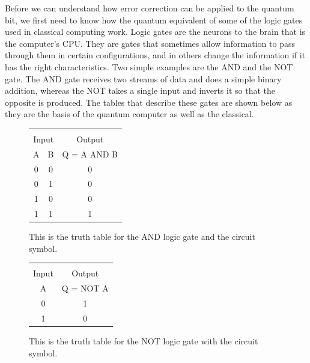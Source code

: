 Before we can understand how error correction can be applied to the quantum bit, we first need to know how the quantum equivalent of some of the logic gates used in classical computing work. Logic gates are the neurons to the brain that is the computer's CPU. They are gates that sometimes allow information to pass through them in certain configurations, and in others change the information if it has the right characteristics. Two simple examples are the AND and the NOT gate. The AND gate receives two streams of data and does a simple binary addition, whereas the NOT takes a single input and inverts it so that the opposite is produced. The tables that describe these gates are shown below as they are the basis of the quantum computer as well as the classical. 
\begin{figure}[ht]
	\centering
	\begin{minipage}[c]{0.45\linewidth}
		\centering
	 	
	 	\begin{tabular}{c|c|c}
			\multicolumn{3}{c}{}\\
			\multicolumn{2}{c|}{Input} & Output\\ \hline
			A & B & Q = A AND B \\ \hline
			0 & 0 & 0 \\
			0 & 1 & 0 \\
			1 & 0 & 0 \\
			1 & 1 & 1
		\end{tabular}
		\caption{\label{tab:AND}This is the truth table for the AND logic gate and the circuit symbol.}
	\end{minipage}
	\hspace{0.5cm}
	\begin{minipage}[c]{0.45\linewidth}
		\centering
		
		\begin{tabular}{c|c}
			\multicolumn{2}{c}{}\\
			Input & Output\\ \hline
			A & Q = NOT A \\ \hline
			0 & 1 \\
			1 & 0 \\
		\end{tabular}
		\caption{\label{tab:NOT}This is the truth table for the NOT logic gate with the circuit symbol.}
	\end{minipage}
\end{figure}


